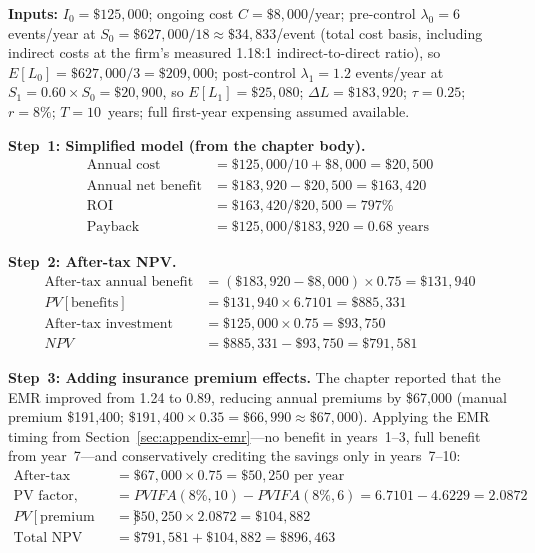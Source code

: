 \documentclass[11pt,openany]{book}
\begin{document}
\textbf{Inputs:} \(I_0 = \$125{,}000\); ongoing cost \(C = \$8{,}000\)/year;
pre-control \(\lambda_0 = 6\) events/year at
\(S_0 = \$627{,}000/18 \approx \$34{,}833\)/event (total
cost basis, including indirect costs at the firm's measured 1.18:1
indirect-to-direct ratio), so \(E[L_0] = \$627{,}000/3 = \$209{,}000\);
post-control \(\lambda_1 = 1.2\) events/year at
\(S_1 = 0.60 \times S_0 = \$20{,}900\), so
\(E[L_1] = \$25{,}080\); \(\Delta L = \$183{,}920\); \(\tau = 0.25\);
\(r = 8\%\); \(T = 10\)~years; full first-year expensing assumed available.

\textbf{Step~1: Simplified model (from the chapter body).}
\begin{align*}
\text{Annual cost} &= \$125{,}000/10 + \$8{,}000 = \$20{,}500 \\
\text{Annual net benefit} &= \$183{,}920 - \$20{,}500 = \$163{,}420 \\
\text{ROI} &= \$163{,}420 / \$20{,}500 = 797\% \\
\text{Payback} &= \$125{,}000 / \$183{,}920 = 0.68 \text{ years}
\end{align*}

\textbf{Step~2: After-tax NPV.}
\begin{align*}
\text{After-tax annual benefit} &= (\$183{,}920 - \$8{,}000) \times 0.75 =
  \$131{,}940 \\
PV[\text{benefits}] &= \$131{,}940 \times 6.7101 = \$885{,}331 \\
\text{After-tax investment} &= \$125{,}000 \times 0.75 = \$93{,}750 \\
NPV &= \$885{,}331 - \$93{,}750 = \$791{,}581
\end{align*}

\textbf{Step~3: Adding insurance premium effects.} The chapter reported that
the EMR improved from 1.24 to 0.89, reducing annual premiums by \$67{,}000
(manual premium \$191{,}400; \(\$191{,}400 \times 0.35 = \$66{,}990 \approx
\$67{,}000\)). Applying the EMR timing from
Section~\ref{sec:appendix-emr}---no benefit in years~1--3, full benefit from
year~7---and conservatively crediting the savings only in years~7--10:
\begin{align*}
\text{After-tax premium savings} &= \$67{,}000 \times 0.75 = \$50{,}250
  \text{ per year} \\
\text{PV factor, years 7--10} &= PVIFA(8\%,10) - PVIFA(8\%,6)
  = 6.7101 - 4.6229 = 2.0872 \\
PV[\text{premium savings}] &= \$50{,}250 \times 2.0872 = \$104{,}882 \\
\text{Total NPV} &= \$791{,}581 + \$104{,}882 = \$896{,}463
\end{align*}
\end{document}
